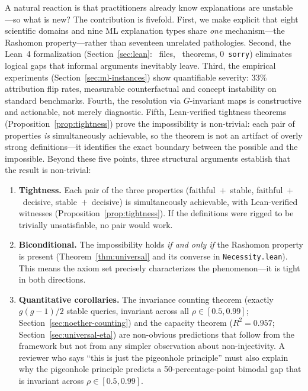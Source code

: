 \documentclass[11pt,a4paper]{article}
\begin{document}
A natural reaction is that practitioners already know explanations are unstable
---so what is new?  The contribution is fivefold.  First, we make explicit that
eight scientific domains and nine ML explanation types share \emph{one}
mechanism---the Rashomon property---rather than seventeen unrelated
pathologies.  Second, the Lean~4
formalization (Section~\ref{sec:lean}: \ClaimMainFiles~files, \ClaimMainTheorems~theorems, 0~\texttt{sorry})
eliminates logical gaps that informal arguments inevitably leave.  Third, the
empirical experiments (Section~\ref{sec:ml-instances}) show quantifiable severity:
33\% attribution flip rates, measurable counterfactual and concept instability on
standard benchmarks.  Fourth, the resolution via $G$-invariant maps is
constructive and actionable, not merely diagnostic.  Fifth, Lean-verified
tightness theorems (Proposition~\ref{prop:tightness}) prove the impossibility
is non-trivial: each pair of properties \emph{is} simultaneously achievable,
so the theorem is not an artifact of overly strong definitions---it identifies
the exact boundary between the possible and the impossible.
Beyond these five points, three structural arguments establish that the
result is non-trivial:

\begin{enumerate}
  \item \textbf{Tightness.}  Each pair of the three properties
    (faithful~$+$~stable, faithful~$+$~decisive, stable~$+$~decisive) is
    simultaneously achievable, with Lean-verified witnesses
    (Proposition~\ref{prop:tightness}).  If the definitions were rigged to be
    trivially unsatisfiable, no pair would work.

  \item \textbf{Biconditional.}  The impossibility holds \emph{if and only if}
    the Rashomon property is present (Theorem~\ref{thm:universal} and
    its converse in \texttt{Necessity.lean}).  This means the axiom set
    precisely characterizes the phenomenon---it is tight in both
    directions.

  \item \textbf{Quantitative corollaries.}  The invariance counting theorem
    (exactly $g(g{-}1)/2$ stable queries, invariant across all
    $\rho \in [0.5, 0.99]$; Section~\ref{sec:noether-counting}) and the
    capacity theorem ($R^2 = 0.957$; Section~\ref{sec:universal-eta}) are non-obvious
    predictions that follow from the framework but not from any simpler
    observation about non-injectivity.  A reviewer who says ``this is just the
    pigeonhole principle'' must also explain why the pigeonhole principle
    predicts a 50-percentage-point bimodal gap that is invariant across
    $\rho \in [0.5, 0.99]$.
\end{enumerate}
\end{document}
